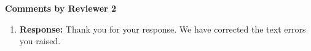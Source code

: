 \documentclass[10pt]{article}
\renewcommand{\theenumi}{(\roman{enumi})}
\renewcommand{\labelenumi}{\theenumi}
\begin{document}
\bigskip
\hspace*{-25pt} \textbf{\large Comments by Reviewer 2}\\



\begin{enumerate}
  \renewcommand{\labelenumi}{[R2:\,\arabic{enumi}]}

 \item {}
 \textbf{Response: } Thank you for your response.  We have corrected the text errors you raised.

\end{enumerate}
\end{document}
